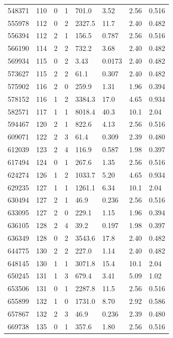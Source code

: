\documentclass[preview]{standalone}
\begin{document}
{{{\begin{tabular}{L{1.2cm}C{1.2cm} C{0.3cm}C{0.5cm} C{1.4cm}C{1.4cm} C{1.4cm}C{1.4cm}}
  548371  &   110  & 0     &  1 &  701.0  & 3.52  & 2.56 &  0.516   \\ 
  555978  &   112  & 0     &  2 &  2327.5  & 11.7  & 2.40 &  0.482   \\ 
  556394  &   112  & 2     &  1 &  156.5  & 0.787  & 2.56 &  0.516   \\ 
  566190  &   114  & 2     &  2 &  732.2  & 3.68  & 2.40 &  0.482   \\ 
  569934  &   115  & 0     &  2 &  3.43  & 0.0173  & 2.40 &  0.482   \\ 
  573627  &   115  & 2     &  2 &  61.1  & 0.307  & 2.40 &  0.482   \\ 
  575902  &   116  & 2     &  0 &  259.9  & 1.31  & 1.96 &  0.394   \\ 
  578152  &   116  & 1     &  2 &  3384.3  & 17.0  & 4.65 &  0.934   \\ 
  582571  &   117  & 1     &  1 &  8018.4  & 40.3  & 10.1 &  2.04   \\ 
  594467  &   120  & 2     &  1 &  822.6  & 4.13  & 2.56 &  0.516   \\ 
  609071  &   122  & 2     &  3 &  61.4  & 0.309  & 2.39 &  0.480   \\ 
  612039  &   123  & 2     &  4 &  116.9  & 0.587  & 1.98 &  0.397   \\ 
  617494  &   124  & 0     &  1 &  267.6  & 1.35  & 2.56 &  0.516   \\ 
  624274  &   126  & 1     &  2 &  1033.7  & 5.20  & 4.65 &  0.934   \\ 
  629235  &   127  & 1     &  1 &  1261.1  & 6.34  & 10.1 &  2.04   \\ 
  630494  &   127  & 2     &  1 &  46.9  & 0.236  & 2.56 &  0.516   \\ 
  633095  &   127  & 2     &  0 &  229.1  & 1.15  & 1.96 &  0.394   \\ 
  636105  &   128  & 2     &  4 &  39.2  & 0.197  & 1.98 &  0.397   \\ 
  636349  &   128  & 0     &  2 &  3543.6  & 17.8  & 2.40 &  0.482   \\ 
  644775  &   130  & 2     &  2 &  227.0  & 1.14  & 2.40 &  0.482   \\ 
  648145  &   130  & 1     &  1 &  3071.8  & 15.4  & 10.1 &  2.04   \\ 
  650245  &   131  & 1     &  3 &  679.4  & 3.41  & 5.09 &  1.02   \\ 
  653506  &   131  & 0     &  1 &  2287.8  & 11.5  & 2.56 &  0.516   \\ 
  655899  &   132  & 1     &  0 &  1731.0  & 8.70  & 2.92 &  0.586   \\ 
  657867  &   132  & 2     &  3 &  46.9  & 0.236  & 2.39 &  0.480   \\ 
  669738  &   135  & 0     &  1 &  357.6  & 1.80  & 2.56 &  0.516   \\ 
\hline 
\end{tabular} 

}}}
\end{document}

